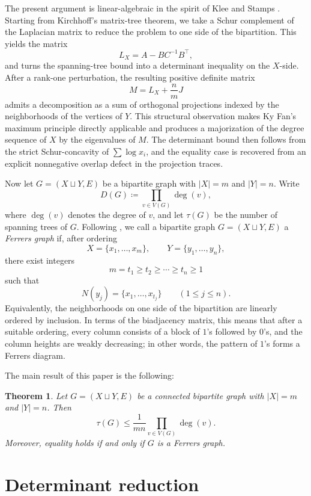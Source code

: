\documentclass[twoside, reqno]{amsart}
\newtheorem{theorem}{Theorem}
\theoremstyle{definition}
\theoremstyle{remark}
\begin{document}
The present argument is linear-algebraic in the spirit of Klee and Stamps
\cite{KleeStampsWeighted,KleeStamps}. Starting from Kirchhoff's matrix-tree
theorem, we take a Schur complement of the Laplacian matrix to reduce the
problem to one side of the bipartition. This yields the matrix
\[
L_X=A-BC^{-1}B^\top,
\]
and turns the spanning-tree bound into a determinant inequality on the
$X$-side. After a rank-one perturbation, the resulting positive definite matrix
\[
M=L_X+\frac{n}{m}J
\]
admits a decomposition as a sum of orthogonal projections indexed by the 
neighborhoods of the vertices of $Y$. This structural observation makes 
Ky Fan's maximum principle directly applicable and produces a majorization 
of the degree sequence of $X$ by the eigenvalues of $M$. The determinant 
bound then follows from the strict Schur-concavity of $\sum\log x_i$, 
and the equality case is recovered from an explicit nonnegative overlap 
defect in the projection traces.

Now let $G=(X\sqcup Y,E)$ be a bipartite graph with $|X|=m$ and $|Y|=n$. Write
\[
D(G)\coloneqq \prod_{v\in V(G)}\deg(v),
\]
where $\deg(v)$ denotes the degree of $v$, and let $\tau(G)$ be the number 
of spanning trees of $G$.
Following \cite{EhrenborgVW}, we call a bipartite graph $G=(X\sqcup Y,E)$ 
a \emph{Ferrers graph} if, after ordering
\[
X=\{x_1,\dots,x_m\},\qquad Y=\{y_1,\dots,y_n\},
\]
there exist integers
\[
m=t_1\ge t_2\ge \cdots \ge t_n\ge 1
\]
such that
\[
N(y_j)=\{x_1,\dots,x_{t_j}\}\qquad (1\le j\le n).
\]
Equivalently, the neighborhoods on one side of the bipartition are 
linearly ordered by inclusion. In terms of the biadjacency matrix, 
this means that after a suitable ordering, every column consists of 
a block of $1$'s followed by $0$'s, and the column heights are weakly 
decreasing; in other words, the pattern of $1$'s forms a Ferrers diagram. 

The main result of this paper is the following:

\begin{theorem}\label{thm:main}
Let $G=(X\sqcup Y,E)$ be a connected bipartite graph with $|X|=m$ and $|Y|=n$. 
Then
\[
\tau(G)\le \frac{1}{mn}\prod_{v\in V(G)}\deg(v).
\]
Moreover, equality holds if and only if $G$ is a Ferrers graph.
\end{theorem}

\section{Determinant reduction}
\end{document}
